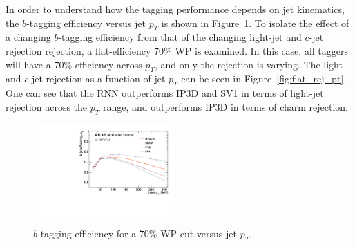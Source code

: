 In order to understand how the tagging performance depends on jet kinematics, the $b$-tagging efficiency versus jet $p_T$ is shown in Figure~\ref{fig:fixed_eff_pt}.
To isolate the effect of a changing $b$-tagging efficiency from that of the changing light-jet and $c$-jet rejection rejection, a flat-efficiency 70\% WP is examined.  In this case, all taggers will have a 70\% efficiency across $p_T$, and only the rejection is varying.  The light- and $c$-jet rejection as a function of jet $p_T$ can be seen in Figure~\ref{fig:flat_rej_pt}.  One can see that the RNN outperforms IP3D and SV1 in terms of light-jet rejection across the $p_T$ range, and outperforms IP3D in terms of charm rejection.

\begin{figure}[htbp]
  \centering
 \includegraphics[width=0.48\textwidth]{figures/RNN/BEff_FixWP70.pdf}
\caption{$b$-tagging efficiency for a 70\% WP cut versus jet $p_T$. }
  \label{fig:fixed_eff_pt}
\end{figure}



